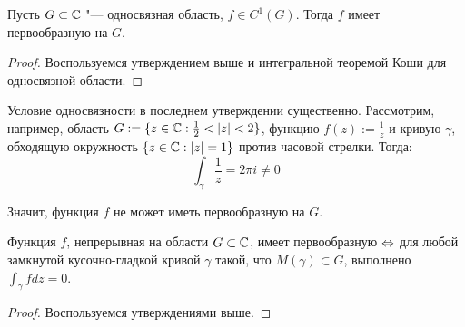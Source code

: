 \begin{corollary}
	Пусть $G \subset \mathbb{C}$ "--- односвязная область, $f \in C^1(G)$. Тогда $f$ имеет первообразную на $G$.
\end{corollary}

\begin{proof}
	Воспользуемся утверждением выше и интегральной теоремой Коши для односвязной области.
\end{proof}

\begin{note}
	Условие односвязности в последнем утверждении существенно. Рассмотрим, например, область $G := \{z \in \mathbb{C}: \frac12 < |z| < 2\}$, функцию $f(z) := \frac1z$ и кривую $\gamma$, обходящую окружность $\{z \in \mathbb{C}: |z| = 1\}$ против часовой стрелки. Тогда:
	\[\int_\gamma\frac1{z} = 2\pi i \ne 0\]
	
	Значит, функция $f$ не может иметь первообразную на $G$.
\end{note}

\begin{theorem}
	Функция $f$, непрерывная на области $G \subset \mathbb{C}$, имеет первообразную $\Leftrightarrow$ для любой замкнутой кусочно-гладкой кривой $\gamma$ такой, что $M(\gamma) \subset G$, выполнено $\int_\gamma fdz = 0$.
\end{theorem}

\begin{proof}
	Воспользуемся утверждениями выше.
\end{proof}